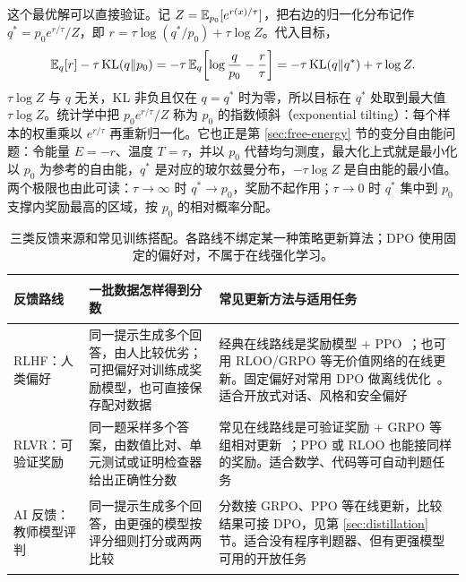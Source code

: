 这个最优解可以直接验证。记 \(Z=\mathbb{E}_{p_0}[e^{r(x)/\tau}]\)，把右边的归一化分布记作 \(q^*=p_0e^{r/\tau}/Z\)，即 \(r=\tau\log(q^*/p_0)+\tau\log Z\)。代入目标，
\begin{equation}
 \mathbb{E}_q[r]-\tau\,\mathrm{KL}(q\Vert p_0)
 =-\tau\,\mathbb{E}_q\!\left[\log\frac{q}{p_0}-\frac{r}{\tau}\right]
 =-\tau\,\mathrm{KL}(q\Vert q^*)+\tau\log Z.
 \label{eq:kl-tilted-proof}
\end{equation}
\(\tau\log Z\) 与 \(q\) 无关，KL 非负且仅在 \(q=q^*\) 时为零，所以目标在 \(q^*\) 处取到最大值 \(\tau\log Z\)。统计学中把 \(p_0e^{r/\tau}/Z\) 称为 \(p_0\) 的指数倾斜（exponential tilting）：每个样本的权重乘以 \(e^{r/\tau}\) 再重新归一化。它也正是第 \ref{sec:free-energy} 节的变分自由能问题：令能量 \(E=-r\)、温度 \(T=\tau\)，并以 \(p_0\) 代替均匀测度，最大化上式就是最小化以 \(p_0\) 为参考的自由能，\(q^*\) 是对应的玻尔兹曼分布，\(-\tau\log Z\) 是自由能的最小值。两个极限也由此可读：\(\tau\to\infty\) 时 \(q^*\to p_0\)，奖励不起作用；\(\tau\to0\) 时 \(q^*\) 集中到 \(p_0\) 支撑内奖励最高的区域，按 \(p_0\) 的相对概率分配。

\begin{table}[H]
\centering\small
\begin{tabularx}{\textwidth}{>{\bfseries\raggedright\arraybackslash}p{30mm} >{\raggedright\arraybackslash}X >{\raggedright\arraybackslash}X}
\toprule
反馈路线 & 一批数据怎样得到分数 & 常见更新方法与适用任务\\
\midrule
RLHF：人类偏好 & 同一提示生成多个回答，由人比较优劣；可把偏好对训练成奖励模型，也可直接保存配对数据 & 经典在线路线是奖励模型 + PPO~\cite{ouyang2022instructgpt}；也可用 RLOO/GRPO 等无价值网络的在线更新。固定偏好对常用 DPO 做离线优化~\cite{rafailov2023dpo}。适合开放式对话、风格和安全偏好\\
RLVR：可验证奖励 & 同一题采样多个答案，由数值比对、单元测试或证明检查器给出正确性分数 & 常见在线路线是可验证奖励 + GRPO 等组相对更新~\cite{shao2024grpo,deepseekr1}；PPO 或 RLOO 也能接同样的奖励。适合数学、代码等可自动判题任务\\
AI 反馈：教师模型评判 & 同一提示生成多个回答，由更强的模型按评分细则打分或两两比较 & 分数接 GRPO、PPO 等在线更新，比较结果可接 DPO，见第 \ref{sec:distillation} 节。适合没有程序判题器、但有更强模型可用的开放任务\\
\bottomrule
\end{tabularx}
\caption{三类反馈来源和常见训练搭配。各路线不绑定某一种策略更新算法；DPO 使用固定的偏好对，不属于在线强化学习。}
\label{tab:posttraining-families}
\end{table}

